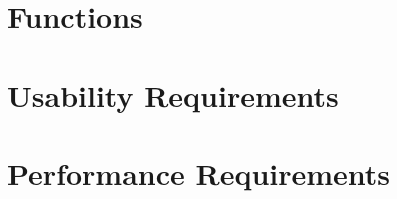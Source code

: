 \documentclass{scrreprt}
\begin{document}
\section{Functions}


\section{Usability Requirements}


\section{Performance Requirements}
\end{document}
